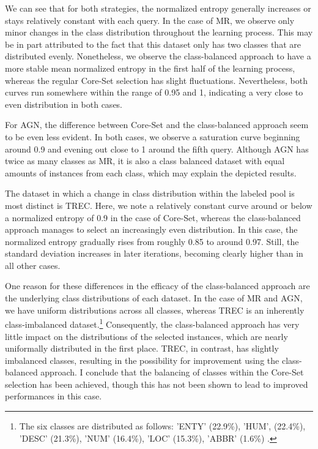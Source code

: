 \documentclass[english,bachelor,ul]{webisthesis} %
\begin{document}
We can see that for both strategies, the normalized entropy generally increases or stays relatively constant with each query. In the case of MR, we observe only minor changes in the class distribution throughout the learning process. This may be in part attributed to the fact that this dataset only has two classes that are distributed evenly. Nonetheless, we observe the class-balanced approach to have a more stable mean normalized entropy in the first half of the learning process, whereas the regular Core-Set selection has slight fluctuations. Nevertheless, both curves run somewhere within the range of 0.95 and 1, indicating a very close to even distribution in both cases. 

For AGN, the difference between Core-Set and the class-balanced approach seem to be even less evident. In both cases, we observe a saturation curve beginning around 0.9 and evening out close to 1 around the fifth query. Although AGN has twice as many classes as MR, it is also a class balanced dataset with equal amounts of instances from each class, which may explain the depicted results.

The dataset in which a change in class distribution within the labeled pool is most distinct is TREC. Here, we note a relatively constant curve around or below a normalized entropy of 0.9 in the case of Core-Set, whereas the class-balanced approach manages to select an increasingly even distribution. In this case, the normalized entropy gradually rises from roughly 0.85 to around 0.97. Still, the standard deviation increases in later iterations, becoming clearly higher than in all other cases. 

One reason for these differences in the efficacy of the class-balanced approach are the underlying class distributions of each dataset. In the case of MR and AGN, we have uniform distributions across all classes, whereas TREC is an inherently class-imbalanced dataset.\footnote{The six classes are distributed as follows: 'ENTY' (22.9\%), 'HUM', (22.4\%), 'DESC' (21.3\%), 'NUM' (16.4\%), 'LOC' (15.3\%), 'ABBR' (1.6\%) \citep{DBLP:journals/nle/LiR06}.} Consequently, the class-balanced approach has very little impact on the distributions of the selected instances, which are nearly uniformally distributed in the first place. TREC, in contrast, has slightly imbalanced classes, resulting in the possibility for improvement using the class-balanced approach. I conclude that the balancing of classes within the Core-Set selection has been achieved, though this has not been shown to lead to improved performances in this case.
\end{document}
